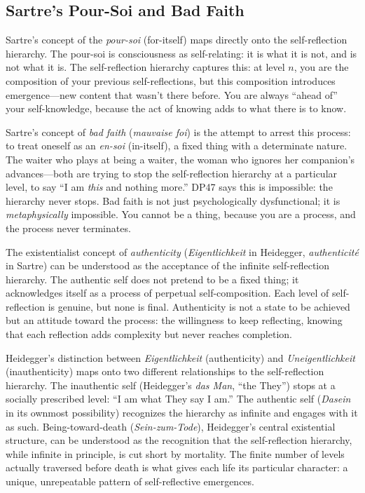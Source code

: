 \subsection{Sartre's Pour-Soi and Bad Faith}

Sartre's concept of the \emph{pour-soi} (for-itself) maps directly onto the
self-reflection hierarchy.  The pour-soi is consciousness as self-relating:
it is what it is not, and is not what it is.  The self-reflection hierarchy
captures this: at level $n$, you are the composition of your previous
self-reflections, but this composition introduces emergence---new content that
wasn't there before.  You are always ``ahead of'' your self-knowledge, because
the act of knowing adds to what there is to know.

Sartre's concept of \emph{bad faith} (\textit{mauvaise foi}) is the attempt
to arrest this process: to treat oneself as an \emph{en-soi} (in-itself), a
fixed thing with a determinate nature.  The waiter who plays at being a waiter,
the woman who ignores her companion's advances---both are trying to stop the
self-reflection hierarchy at a particular level, to say ``I am \emph{this} and
nothing more.''  DP47 says this is impossible: the hierarchy never stops.  Bad
faith is not just psychologically dysfunctional; it is \emph{metaphysically}
impossible.  You cannot be a thing, because you are a process, and the process
never terminates.

The existentialist concept of \emph{authenticity} (\textit{Eigentlichkeit} in
Heidegger, \textit{authenticit\'e} in Sartre) can be understood as the
acceptance of the infinite self-reflection hierarchy.  The authentic self does
not pretend to be a fixed thing; it acknowledges itself as a process of
perpetual self-composition.  Each level of self-reflection is genuine, but
none is final.  Authenticity is not a state to be achieved but an attitude
toward the process: the willingness to keep reflecting, knowing that each
reflection adds complexity but never reaches completion.

Heidegger's distinction between \emph{Eigentlichkeit} (authenticity) and
\emph{Uneigentlichkeit} (inauthenticity) maps onto two different relationships
to the self-reflection hierarchy.  The inauthentic self (Heidegger's
\emph{das Man}, ``the They'') stops at a socially prescribed level: ``I am what
They say I am.''  The authentic self (\emph{Dasein} in its ownmost possibility)
recognizes the hierarchy as infinite and engages with it as such.
Being-toward-death (\textit{Sein-zum-Tode}), Heidegger's central existential
structure, can be understood as the recognition that the self-reflection
hierarchy, while infinite in principle, is cut short by mortality.  The finite
number of levels actually traversed before death is what gives each life its
particular character: a unique, unrepeatable pattern of self-reflective
emergences.

